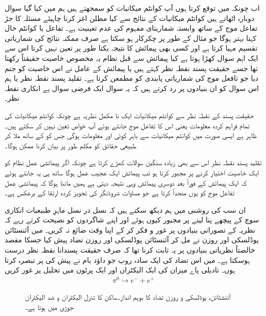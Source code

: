 اب چونکہ میں توقع کرتا ہوں آپ کوانٹم میکانیات کو سمجھتے ہیں ہم  میں کیا گیا سوال دوبارہ اٹھاتے ہیں کوانٹم میکانیات کے نتائج سے کیا مطلن اغز کرنا چاہیئے مسئلہ کا جڑ تفاعل موج کے ساتھ وابستہ شماریتای مفہوم کی عدم تعینیت ہے۔ تفاعل  یا کوانٹم حال کہنا بہتر ہوگا جو مثال کے طور پر چکرکار ہو سکتا ہے صرف ممکنہ نتائج کی شماریاتی تقسیم مہیا کرتا ہے اور کسی بھی پیمائش کا نتیجہ یکتا طور پر تعین نہیں کرتا اس سے ایک اہم سوال کھڑا ہوتا ہے کیا پیمائش سے قبل نظام یہ مخصوص خاصیت حقیقتاً رکھتا تھا جسے حقیقت پسند نقطہ نظر کہتے ہیں یا پیمائش کے عامل نے اس خاصیت کو جنم دیا جو تافعل موج کی شماریاتی پابندی کو مطمعن کرتا ہے۔ تقلید پسند نقطہ نظر یا ہم اس سوال کو ان بنیادوں پر رد کرتے ہیں کہ یہ سوال ایک فرضی سوال ہے انکاری نقطہ نظر۔

حقیقت پسند کے نقطہ نظر سے کوانٹم میکانیات ایک نا مکمل نظریہ ہے چونکہ کوانٹم میکانیات کی تمام فراہم کردہ معلومات یعنی اس کا تفاعل موج جانتے ہوئے آپ خواص تعین نہیں کر سکتے ہیں۔ ظاہر ہے ایسی صورت میں کوانٹم میکانیات سے باہر کوئی اور معلومات ہوگی جس کو  کے ساتھ ملا کر طبیعی حقائق کو مکلم طور پر بیان کرنا ممکن ہوگا۔

تقلید پسند نقطہ نظر اس سے بھی زیادہ سنگین سوالات کھڑے کرتا ہے چونکہ اگر پیمائشی عمل نظام کو ایک خاصیت اختیار کرنے پر مجبور کرتا ہو تب پیمائش ایک عجیب عمل ہوگا ساتھ ہی یہ جانتے ہوئے کہ ایک پیمائش کے فوراً بعد دوسری پیمائش وہی نتیجہ دیتی ہے ہمیں ماننا ہوگا کہ پیمائشی عمل تفاعل موج کو یوں منحداً کرتا ہے جو مساوات شروڈنگر کی تجویز کردہ ارتقا کے برعکس ہے۔

ان سب کی روشنی میں ہم دیکھ سکتے ہیں کہ نسل در نسل ماہرِ طبیعیات انکاری سوچ کے پیچھے پنا لینے پر مجبور کیوں ہوئے اور اپنے شاگردوں کو نصیحت کرتے رہے کہ نظریہ کے تصوراتی بنیادوں پر غور و فکر کر کے اپنا وقت ضائع نہ کریں۔
میں آئنسٹائن پوڈلسکی اور روزن نے مل کر آئنسٹائن پوڈلسکی اور روزن تضاد پیش کیا جسکا مقصد خالصتاً نظریاتی بنیادوں پر یہ ثابت کرنا تھا کہ صرف حقیقت پسندانا نقطہ نظر درست ہوسکتا ہے۔ میں اس تضاد کی ایک سادہ روپ جو داؤد بام نے پیش کی پر تبصرہ کرتا ہوں۔ تادیلی پاے میزان کی ایک الیکٹران اور ایک پرٹون میں تحلیل پر غور کریں
\begin{align*}
	\pi^0\to e^{-}+e^{+}
\end{align*}
%
\begin{figure}
\centering
{}
\caption{آئنشٹائن، پوڈلسکی و  روزن  تضاد کا بوہم انداز۔ساکن   کا تنزل الیکٹران و  ضد الیکٹران  جوڑی میں ہوتا ہے۔}
\label{شکل_بکھراو_بوہم_تنزل}
\end{figure}

